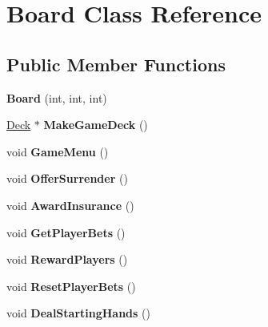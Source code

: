 \hypertarget{class_board}{}\section{Board Class Reference}
\label{class_board}
\subsection*{Public Member Functions}
\begin{DoxyCompactItemize}
\item 
{\bfseries Board} (int, int, int)\hypertarget{class_board_a299f62d90ba5fbdc8440bfe308b8a8aa}{}\label{class_board_a299f62d90ba5fbdc8440bfe308b8a8aa}

\item 
\hyperlink{class_deck}{Deck} $\ast$ {\bfseries Make\+Game\+Deck} ()\hypertarget{class_board_a0716f4188a7a6d3d4cbeecbf19c2e1b8}{}\label{class_board_a0716f4188a7a6d3d4cbeecbf19c2e1b8}

\item 
void {\bfseries Game\+Menu} ()\hypertarget{class_board_a17cbef8bdb3bfedffd137834b53e1a83}{}\label{class_board_a17cbef8bdb3bfedffd137834b53e1a83}

\item 
void {\bfseries Offer\+Surrender} ()\hypertarget{class_board_ab6f39b1cec34664fe6d97697d31a898a}{}\label{class_board_ab6f39b1cec34664fe6d97697d31a898a}

\item 
void {\bfseries Award\+Insurance} ()\hypertarget{class_board_ad13e0d28f17bbd00bac5449a88ed7f2e}{}\label{class_board_ad13e0d28f17bbd00bac5449a88ed7f2e}

\item 
void {\bfseries Get\+Player\+Bets} ()\hypertarget{class_board_a375b51bf1380bdd7b204d8229f16e331}{}\label{class_board_a375b51bf1380bdd7b204d8229f16e331}

\item 
void {\bfseries Reward\+Players} ()\hypertarget{class_board_a4a512138d509b89f282f6eb17e02f24c}{}\label{class_board_a4a512138d509b89f282f6eb17e02f24c}

\item 
void {\bfseries Reset\+Player\+Bets} ()\hypertarget{class_board_a8ad211cf1d6e8bb62ae4488a6c6f50f3}{}\label{class_board_a8ad211cf1d6e8bb62ae4488a6c6f50f3}

\item 
void {\bfseries Deal\+Starting\+Hands} ()\hypertarget{class_board_a7a70fb73a8b8c638a3f93cf35f6a1e0a}{}\label{class_board_a7a70fb73a8b8c638a3f93cf35f6a1e0a}


\end{DoxyCompactItemize}
